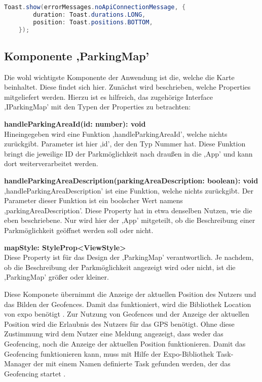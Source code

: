 \begin{lstlisting}[caption={Ein Beispiel des Aufrufs eines Toasts aus der Datei ,DbConnectionService.ts'. (Quelle: Eigene Implementierung)},captionpos=b, language=Java, label=lst:toast]
	Toast.show(errorMessages.noApiConnectionMessage, {
		duration: Toast.durations.LONG,
		position: Toast.positions.BOTTOM,
	});
\end{lstlisting}

\subsection{Komponente ,ParkingMap'}
Die wohl wichtigste Komponente der Anwendung ist die, welche die Karte beinhaltet. Diese findet sich hier. Zunächst wird beschrieben, welche Properties mitgeliefert werden. Hierzu ist es hilfreich, das zugehörige Interface ,IParkingMap' mit den Typen der Properties zu betrachten:
\begin{description}
	\item \textbf{handleParkingAreaId(id: number): void} \\ Hineingegeben wird eine Funktion ,handleParkingAreaId', welche nichts zurückgibt. Parameter ist hier ,id', der den Typ Nummer hat. Diese Funktion bringt die jeweilige ID der Parkmöglichkeit nach draußen in die ,App' und kann dort weiterverarbeitet werden.
	\item \textbf{handleParkingAreaDescription(parkingAreaDescription: boolean): void} \\ ,handleParkingAreaDescription' ist eine Funktion, welche nichts zurückgibt. Der Parameter dieser Funktion ist ein boolscher Wert namens ,parkingAreaDescription'. Diese Property hat in etwa denselben Nutzen, wie die eben beschriebene. Nur wird hier der ,App' mitgeteilt, ob die Beschreibung einer Parkmöglichkeit geöffnet werden soll oder nicht.
	\item \textbf{mapStyle: StyleProp<ViewStyle>} \\ Diese Property ist für das Design der ,ParkingMap' verantwortlich. Je nachdem, ob die Beschreibung der Parkmöglichkeit angezeigt wird oder nicht, ist die ,ParkingMap' größer oder kleiner.
\end{description}

Diese Komponete übernimmt die Anzeige der aktuellen Position des Nutzers und das Bilden der Geofences. Damit das funktioniert, wird die Bibliothek Location von expo benötigt \cite{expoLocation}. Zur Nutzung von Geofences und der Anzeige der aktuellen Position wird die Erlaubnis des Nutzers für das GPS benötigt. Ohne diese Zustimmung wird dem Nutzer eine Meldung angezeigt, dass weder das Geofencing, noch die Anzeige der aktuellen Position funktionieren. Damit das Geofencing funktionieren kann, muss mit Hilfe der Expo-Bibliothek Task-Manager der mit einem Namen definierte Task gefunden werden, der das Geofencing startet \cite{taskmanager}.

